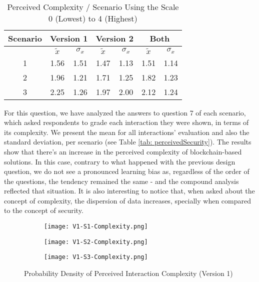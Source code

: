 \begin{table}[htb]
	\centering
	\caption{Perceived Complexity / Scenario Using the Scale 0 (Lowest) to 4 (Highest)}
	\label{tab: perceivedComplexity}
	\begin{tabular}{c|cc|cc|cc}
		\hline
		Scenario & \multicolumn{2}{c}{\bf Version 1} \vrule & \multicolumn{2}{c}{\bf Version 2} \vrule & \multicolumn{2}{c}{\bf Both}                                             \\
		\hline
		         & $\tilde{x}$                       & $\sigma_{x}$                             & $\tilde{x}$                  & $\sigma_{x}$ & $\tilde{x}$ & $\sigma_{x}$ \\
		\hline
		1        & 1.56                              & 1.51                                     & 1.47                         & 1.13         & 1.51        & 1.14         \\
		\hline
		2        & 1.96                              & 1.21                                     & 1.71                         & 1.25         & 1.82        & 1.23         \\
		\hline
		3        & 2.25                              & 1.26                                     & 1.97                         & 2.00         & 2.12        & 1.24         \\
		\hline
	\end{tabular}
\end{table}

For this question, we have analyzed the answers to question 7 of each scenario, which asked respondents to grade each interaction they were shown, in terms of its complexity. We present the mean for all interactions' evaluation and also the standard deviation, per scenario (see Table \ref{tab: perceivedSecurity}). The results show that there's an increase in the perceived complexity of blockchain-based solutions. In this case, contrary to what happened with the previous design question, we do not see a pronounced learning bias as, regardless of the order of the questions, the tendency remained the same - and the compound analysis reflected that situation. It is also interesting to notice that, when asked about the concept of complexity, the dispersion of data increases, specially when compared to the concept of security.

\begin{figure}[htb]
	\centering
	\begin{subfigure}[b]{0.49\textwidth}
		\centering
		\texttt{[image: V1-S1-Complexity.png]}
	\end{subfigure}
	\begin{subfigure}[b]{0.49\textwidth}
		\centering
		\texttt{[image: V1-S2-Complexity.png]}
	\end{subfigure}
	\hfill
	\begin{subfigure}[b]{0.49\textwidth}
		\centering
		\texttt{[image: V1-S3-Complexity.png]}
	\end{subfigure}

	\caption{Probability Density of Perceived Interaction Complexity (Version 1)}
	\label{fig: perceivedInteractionComplexityOne}
\end{figure}

